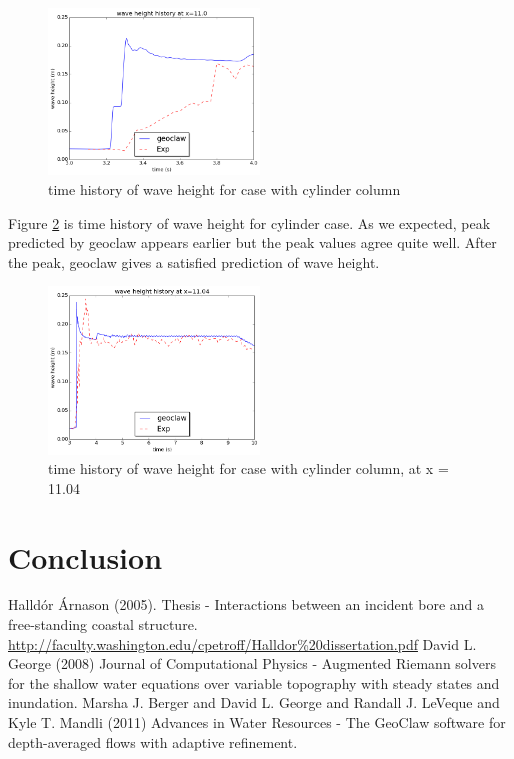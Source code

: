\documentclass[11pt]{article}
\begin{document}
\begin{figure}[h!]
    \centering
    \includegraphics[width=0.5\textwidth]{./plots/waveheight_cylinder_x11}
    \caption{time history of wave height for case with cylinder column}
    \label{fig:waveheight_cylinder_x=11.0}
\end{figure}
\par
Figure \ref{fig:waveheight_cylinder_x=11.04} is time history of wave height for cylinder case. As we expected, peak predicted by geoclaw appears earlier but the peak values agree quite well.
After the peak, geoclaw gives a satisfied prediction of wave height.
\begin{figure}[h!]
    \centering
    \includegraphics[width=0.5\textwidth]{./plots/waveheight_cylinder_x1104_largerTimeScale}
    \caption{time history of wave height for case with cylinder column, at x = 11.04}
    \label{fig:waveheight_cylinder_x=11.04}
\end{figure}

\section{Conclusion}\label{Sec:Conclusion}
{\footnotesize
\begin{thebibliography}{100}
 Halld\'or \'Arnason  (2005). Thesis - Interactions between an incident bore and a free-standing coastal structure. \url{http://faculty.washington.edu/cpetroff/Halldor%20dissertation.pdf}
 David L. George (2008) Journal of Computational Physics - Augmented Riemann solvers for the shallow water equations over variable topography with steady states and inundation.
 Marsha J. Berger and David L. George and Randall J. LeVeque and Kyle T. Mandli (2011) Advances in Water Resources - The GeoClaw software for depth-averaged flows with adaptive refinement.
\end{thebibliography}
}
\end{document}
